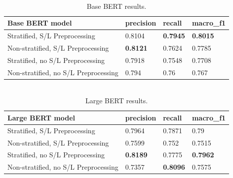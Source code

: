 \documentclass[conference]{IEEEtran}
\begin{document}
\begin{table}[H]
\centering
\begin{tabular}{|l|l|l|l|}
\hline
    Base BERT model   & precision   & recall & macro\_f1     \\ \hline
Stratified, S/L Preprocessing & 0.8104 & \textbf{0.7945} & \textbf{0.8015} \\
Non-stratified, S/L Preprocessing & \textbf{0.8121} & 0.7624 & 0.7785 \\
Stratified, no S/L Preprocessing & 0.7918 & 0.7548 & 0.7708 \\
Non-stratified, no S/L Preprocessing & 0.794 & 0.76 & 0.767 \\ \hline
\end{tabular}
\caption{\label{tab:large-BERT-results}\\ Base BERT results.}
\end{table}

\begin{table}[H]
\centering
\begin{tabular}{|l|l|l|l|}
\hline
    Large BERT model   & precision   & recall & macro\_f1     \\ \hline
Stratified, S/L Preprocessing & 0.7964 & 0.7871 & 0.79 \\
Non-stratified, S/L Preprocessing & 0.7599 & 0.752 & 0.7515 \\
Stratified, no S/L Preprocessing & \textbf{0.8189} & 0.7775 & \textbf{0.7962} \\
Non-stratified, no S/L Preprocessing & 0.7357 & \textbf{0.8096} & 0.7575 \\ \hline
\end{tabular}
\caption{\label{tab:base-BERT-results}\\ Large BERT results.}
\end{table}
\end{document}
